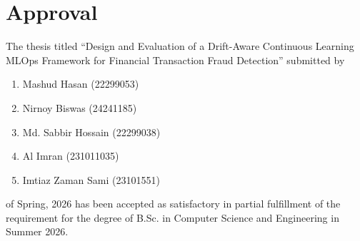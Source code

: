 \documentclass[12pt,a4paper]{report}
\begin{document}
\chapter*{Approval}
The thesis titled ``Design and Evaluation of a Drift-Aware Continuous Learning MLOps Framework for Financial Transaction Fraud Detection'' submitted by
\begin{enumerate}
  \item Mashud Hasan (22299053)
  \item Nirnoy Biswas (24241185)
  \item Md. Sabbir Hossain (22299038)
  \item Al Imran (231011035)
  \item Imtiaz Zaman Sami (23101551)
\end{enumerate}
of Spring, 2026 has been accepted as satisfactory in partial fulfillment of the requirement for the degree of B.Sc. in Computer Science and Engineering in Summer 2026.
\end{document}
